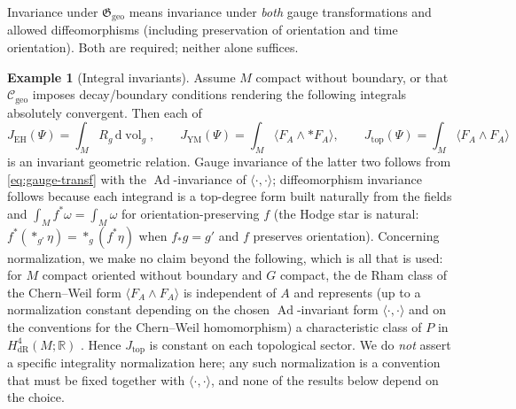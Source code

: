 \documentclass[11pt,a4paper]{article}
\theoremstyle{plain}
\theoremstyle{definition}
\newtheorem{example}[theorem]{Example}
\theoremstyle{remark}
\newcommand{\Real}{\mathbb{R}}
\newcommand{\Ggeo}{\mathfrak{G}_{\mathrm{geo}}}
\newcommand{\Cgeo}{\mathcal{C}_{\mathrm{geo}}}
\newcommand{\Ad}{\operatorname{Ad}}
\newcommand{\dvol}{\mathrm{d}\!\operatorname{vol}_g}
\begin{document}
Invariance under $\Ggeo$ means invariance under \emph{both} gauge transformations and allowed
diffeomorphisms (including preservation of orientation and time orientation). Both are required;
neither alone suffices.

\begin{example}[Integral invariants]
\label{ex:integral-invariants}
Assume $M$ compact without boundary, or that $\Cgeo$ imposes decay/boundary conditions rendering
the following integrals absolutely convergent. Then each of
\begin{equation}
\label{eq:integral-invariants}
J_{\mathrm{EH}}(\Psi)=\int_M R_g\,\dvol,
\qquad
J_{\mathrm{YM}}(\Psi)=\int_M \bigl\langle F_A\wedge \ast F_A\bigr\rangle,
\qquad
J_{\mathrm{top}}(\Psi)=\int_M \bigl\langle F_A\wedge F_A\bigr\rangle
\end{equation}
is an invariant geometric relation. Gauge invariance of the latter two follows from
\eqref{eq:gauge-transf} with the $\Ad$-invariance of $\langle\cdot,\cdot\rangle$; diffeomorphism
invariance follows because each integrand is a top-degree form built naturally from the fields and
$\int_M f^*\omega=\int_M\omega$ for orientation-preserving $f$ (the Hodge star is natural:
$f^*(\ast_{g'}\eta)=\ast_{g}(f^*\eta)$ when $f_*g=g'$ and $f$ preserves orientation).
Concerning normalization, we make no claim beyond the following, which is all that is used: for
$M$ compact oriented without boundary and $G$ compact, the de Rham class of the Chern--Weil form
$\langle F_A\wedge F_A\rangle$ is independent of $A$ and represents (up to a normalization
constant depending on the chosen $\Ad$-invariant form $\langle\cdot,\cdot\rangle$ and on the
conventions for the Chern--Weil homomorphism) a characteristic class of $P$ in
$H^4_{\mathrm{dR}}(M;\Real)$ \cite{ChernWeil,MilnorStasheff,KobayashiNomizu2}. Hence
$J_{\mathrm{top}}$ is constant on each topological sector. We do \emph{not} assert a specific
integrality normalization here; any such normalization is a convention that must be fixed
together with $\langle\cdot,\cdot\rangle$, and none of the results below depend on the choice.
\end{example}
\end{document}
